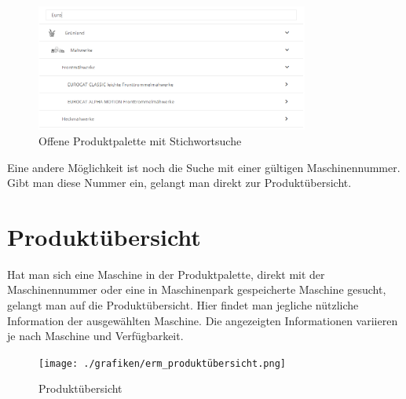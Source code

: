 \begin{figure}[H]
	\centerline{
		\includegraphics[width=0.8\textwidth]{./grafiken/erm_produktpalette_offen_stichwort.PNG}
	}
	\vskip0pt
	\caption{Offene Produktpalette mit Stichwortsuche} \label{fig:produktpaletteMitStichwort}
\end{figure}
Eine andere Möglichkeit ist noch die Suche mit einer gültigen Maschinennummer. Gibt man diese Nummer ein, gelangt man direkt zur Produktübersicht.

\section{Produktübersicht}
Hat man sich eine Maschine in der Produktpalette, direkt mit der Maschinennummer oder eine in Maschinenpark gespeicherte Maschine gesucht, gelangt man auf die Produktübersicht. Hier findet man jegliche nützliche Information der ausgewählten Maschine. Die angezeigten Informationen variieren je nach Maschine und Verfügbarkeit.
\begin{figure}[H]
	\centerline{
		\texttt{[image: ./grafiken/erm\_produktübersicht.png]}
	}
	\vskip0pt
	\caption{Produktübersicht} \label{fig:produktübersicht}
\end{figure}
